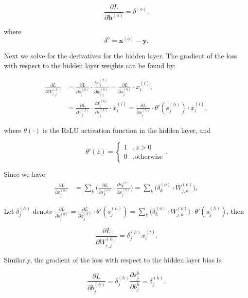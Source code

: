 \documentclass[12pt]{article}
\newcommand{\parder}[2] {
  \frac{\partial{#1} }{\partial{#2}}
}
\begin{document}
\begin{equation}
\label{eqn:m_dl_dbo}
\parder{L}{\textbf{b}^{(o)}} = \delta^{(o)}.
\end{equation}

where 
\begin{equation}
  \label{eqn:m_delta_o}
  \delta^{o} = \textbf{x}^{(o)} - \textbf{y}.
\end{equation}

Next we solve for the derivatives for the hidden layer. The gradient of the loss with respect to the hidden layer weights can be found by:

\begin{align*}
\parder{L}{W_{i,j}^{(h)}} &= \parder{L}{s_j^{(h)}} \cdot \parder{s_j^{(h)}}{w_{i,j}^{(h)}}
= \parder{L}{s_j^{(h)}} \cdot x_i^{(i)}, \\
&= \parder{L}{x_j^{(h)}} \cdot \parder{x_j^{(h)}}{s_j^{(h)}} \cdot x_i^{(i)}
= \parder{L}{x_j^{(h)}} \cdot \theta'(s_j^{(h)}) \cdot x_i^{(i)},
\end{align*}

where $\theta(\cdot)$ is the ReLU activation function in the hidden layer, and

\begin{equation}
\label{eqn:drelu}
\theta'(z) = \begin{cases} 1 &, z > 0 \\ 0 &, \text{otherwise} \end{cases}.
\end{equation}

Since we have \begin{align*}
\parder{L}{x_j^{(h)}} &= \sum_k \Big( \parder{L}{s_k^{(o)}} \cdot \parder{s_k^{(o)}}{x_j^{(h)}} \Big)
= \sum_k \Big( \delta_k^{(o)} \cdot W_{j, k}^{(o)} \Big),
\end{align*}

Let $\delta_j^{(h)}$ denote $\parder{L}{s_j^{(h)}}  = \parder{L}{x_j^{(h)}} \cdot \theta'(s_j^{(h)}) = \sum_k \big( \delta_k^{(o)} \cdot W_{j, k}^{(o)} \big) \cdot \theta'(s_j^{(h)})$, then

\begin{equation}
\label{eqn:dl_dwh}
\parder{L}{W_{i,j}^{(h)}} = \delta_j^{(h)} x_i^{(i)}.
\end{equation}

Similarly, the gradient of the loss with respect to the hidden layer bias is

\begin{equation}
\label{eqn:dl_dbh}
\parder{L}{b_{j}^{(h)}} = \delta_j^{(h)} \parder{s_j^{h}}{b_j^{h}}
= \delta_j^{(h)}.
\end{equation}
\end{document}

